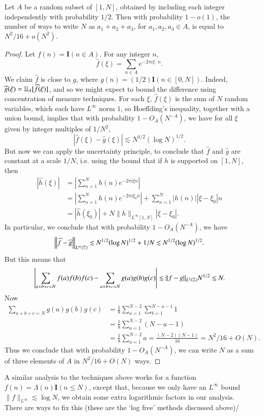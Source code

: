 \begin{theorem}
    Let $A$ be a random subset of $[1,N]$, obtained by including each integer independently with probability $1/2$. Then with probability $1 - o(1)$, the number of ways to write $N$ as $a_1 + a_2 + a_3$, for $a_1,a_2,a_3 \in A$, is equal to $N^2 / 16 + o(N^2)$.
\end{theorem}
\begin{proof}
    Let $f(n) = \mathbf{I}(n \in A)$. For any integer $n$,
    \[ \widehat{f}(\xi) = \sum_{n \in A} e^{-2 \pi i \xi \cdot n}. \]
    We claim $\widehat{f}$ is close to $\widehat{g}$, where $g(n) = (1/2) \mathbf{I}(n \in [0,N])$. Indeed, $\widehat{g}(\xi) = \operatorname{\mathbb{E}}_A[\widehat{f}(\xi)]$, and so we might expect to bound the difference using concentration of measure techniques. For each $\xi$, $\widehat{f}(\xi)$ is the sum of $N$ random variables, which each have $L^\infty$ norm $1$, so Hoeffding's inequality, together with a union bound, implies that with probability $1 - O_A(N^{-A})$, we have for all $\xi$ given by integer multiples of $1/N^2$,
    \[ |\widehat{f}(\xi) - \widehat{g}(\xi)| \lesssim N^{1/2} (\log N)^{1/2}. \]
    But now we can apply the uncertainty principle, to conclude that $\widehat{f}$ and $\widehat{g}$ are constant at a scale $1/N$, i.e. using the bound that if $h$ is supported on $[1,N]$, then
    \begin{align*}
        |\widehat{h}(\xi)| &= \left| \sum_{n = 1}^N h(n) e^{-2 \pi i \xi n} \right|\\
        &= \left| \sum_{n = 1}^N h(n) e^{-2 \pi i \xi_0 n} \right| + \sum_{n = 1}^N |h(n)| |\xi - \xi_0| n\\
        &= |\widehat{h}(\xi_0)| + N \| h \|_{L^\infty[1,N]} |\xi - \xi_0|.
    \end{align*}
    In particular, we conclude that with probability $1 - O_A(N^{-A})$, we have
    \[ \left\| \widehat{f} - \widehat{g} \right\|_{L^\infty(\operatorname{\mathbb{T}})} \lesssim N^{1/2} (\log N)^{1/2} + 1/N \lesssim N^{1/2} (\log N)^{1/2}. \]
    But this means that
    \[ \left| \sum_{a + b + c = N} f(a) f(b) f(c) - \sum_{a + b + c = N} g(a) g(b) g(c) \right| \lesssim \| f - g \|_{L^2(\operatorname{\mathbb{Z}})} N^{1/2} \lesssim N. \]
    Now
    \begin{align*}
        \sum_{a + b + c = N} g(a) g(b) g(c) &= \frac{1}{8} \sum_{a = 1}^{N-2} \sum_{b = 1}^{N -a-1} 1\\
        &= \frac{1}{8} \sum_{a = 1}^{N-2} (N-a-1)\\
        &= \frac{1}{8} \sum_{a = 1}^{N-2} a = \frac{(N-2)(N-1)}{16} = N^2/16 + O(N).
    \end{align*}
    Thus we conclude that with probability $1 - O_A(N^{-A})$, we can write $N$ as a sum of three elements of $A$ in $N^2/16 + O(N)$ ways.
\end{proof}

A similar analysis to the techniques above works for a function $f(n) = \Lambda(n) \mathbf{I}(n \leq N)$, except that, because we only have an $L^\infty$ bound $\| f \|_{L^\infty} \lesssim \log N$, we obtain some extra logarithmic factors in our analysis. There are ways to fix this (these are the `log free' methods discussed above)/

